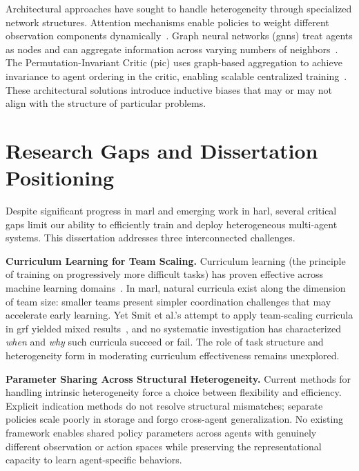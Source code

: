 Architectural approaches have sought to handle heterogeneity 
through specialized network structures. Attention mechanisms 
enable policies to weight different observation components 
dynamically~\cite{iqbal2019}. Graph neural networks (\glspl{gnn}) 
treat agents as nodes and can aggregate information across varying 
numbers of neighbors~\cite{yang2021a,liu2020b}. 
The Permutation-Invariant Critic (\gls{pic}) uses graph-based 
aggregation to achieve invariance to agent ordering in the critic, 
enabling scalable centralized training~\cite{liu2020b}. 
These architectural solutions introduce inductive biases 
that may or may not align with the structure of particular problems.


\section{Research Gaps and Dissertation Positioning}%
\label{sec:intro_gaps}

Despite significant progress in \gls{marl} and emerging work in \gls{harl}, 
several critical gaps limit our ability to efficiently train and deploy 
heterogeneous multi-agent systems. This dissertation addresses three interconnected challenges.

\textbf{Curriculum Learning for Team Scaling.} 
Curriculum learning (the principle of training on progressively 
more difficult tasks) has proven effective across machine learning 
domains~\cite{narvekar2020}. In \gls{marl}, natural curricula exist 
along the dimension of team size: smaller teams present simpler 
coordination challenges that may accelerate early learning. 
Yet Smit et al.'s attempt to apply team-scaling curricula in 
\gls{grf} yielded mixed results~\cite{smit2023}, and no systematic 
investigation has characterized \emph{when} and \emph{why} such 
curricula succeed or fail. The role of task structure and 
heterogeneity form in moderating curriculum effectiveness remains unexplored.

\textbf{Parameter Sharing Across Structural Heterogeneity.} 
Current methods for handling intrinsic heterogeneity force a choice 
between flexibility and efficiency. Explicit indication methods do 
not resolve structural mismatches; separate policies scale poorly 
in storage and forgo cross-agent generalization. 
No existing framework enables shared policy parameters across 
agents with genuinely different observation or action spaces 
while preserving the representational capacity to learn agent-specific behaviors.

